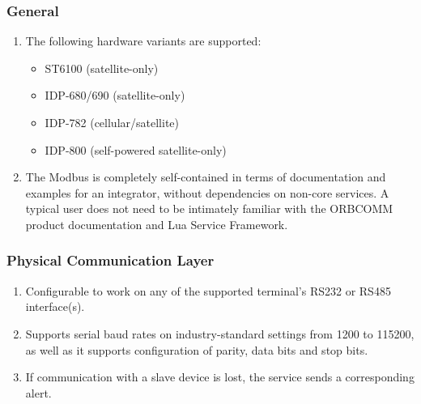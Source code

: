 \documentclass[letterpaper,10pt,english]{sphinxmanual}
\begin{document}
\subsubsection{General}
\label{\detokenize{funcspec:general}}\begin{enumerate}
\item {} 
The following hardware variants are supported:
\begin{itemize}
\item {} 
ST6100 (satellite-only)

\item {} 
IDP-680/690 (satellite-only)

\item {} 
IDP-782 (cellular/satellite)

\item {} 
IDP-800 (self-powered satellite-only)

\end{itemize}

\item {} 
The Modbus  is completely self-contained in terms of documentation and examples for an integrator, without dependencies on non-core  services.
A typical user does not need to be intimately familiar with the ORBCOMM product documentation and Lua Service Framework.

\end{enumerate}


\subsubsection{Physical Communication Layer}
\label{\detokenize{funcspec:physical-communication-layer}}\begin{enumerate}
\item {} 
Configurable to work on any of the supported terminal’s RS232 or RS485 interface(s).

\item {} 
Supports serial baud rates on industry-standard settings from 1200 to 115200, as well as it supports configuration of parity, data bits and stop bits.

\item {} 
If communication with a slave device is lost, the service sends a corresponding alert.

\end{enumerate}
\end{document}
